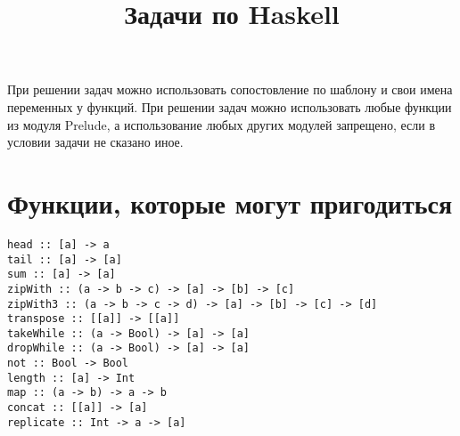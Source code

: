 \documentclass[a4paper,10pt]{article}
\begin{document}
\lstset{language=Haskell} 
\setcounter{secnumdepth}{0}
\title{Задачи по Haskell}
\date{}
\maketitle
При решении задач можно использовать сопостовление по шаблону и свои имена переменных у функций.
При решении задач можно использовать любые функции из модуля Prelude, а использование любых других
модулей запрещено, если в условии задачи не сказано иное.
\section{Функции, которые могут пригодиться}
\begin{lstlisting}
head :: [a] -> a
tail :: [a] -> [a]
sum :: [a] -> [a]
zipWith :: (a -> b -> c) -> [a] -> [b] -> [c]
zipWith3 :: (a -> b -> c -> d) -> [a] -> [b] -> [c] -> [d]
transpose :: [[a]] -> [[a]]
takeWhile :: (a -> Bool) -> [a] -> [a]
dropWhile :: (a -> Bool) -> [a] -> [a]
not :: Bool -> Bool
length :: [a] -> Int
map :: (a -> b) -> a -> b
concat :: [[a]] -> [a]
replicate :: Int -> a -> [a]
\end{lstlisting}
\end{document}

